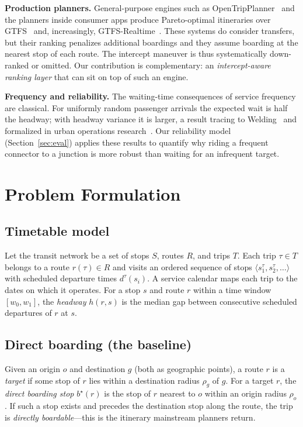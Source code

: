 \documentclass[conference]{IEEEtran}
\begin{document}
\textbf{Production planners.} General-purpose engines such as
OpenTripPlanner~\cite{otp} and the planners inside consumer apps produce
Pareto-optimal itineraries over GTFS~\cite{gtfs} and, increasingly,
GTFS-Realtime~\cite{gtfsrt}. These systems do consider transfers, but their
ranking penalizes additional boardings and they assume boarding at the nearest
stop of each route. The intercept maneuver is thus systematically
down-ranked or omitted. Our contribution is complementary: an
\emph{intercept-aware ranking layer} that can sit on top of such an engine.

\textbf{Frequency and reliability.} The waiting-time consequences of service
frequency are classical. For uniformly random passenger arrivals the expected
wait is half the headway; with headway variance it is larger, a result tracing to
Welding~\cite{welding1957} and formalized in urban operations
research~\cite{osuna1972,larson1981}. Our reliability model
(Section~\ref{sec:eval}) applies these results to quantify why riding a frequent
connector to a junction is more robust than waiting for an infrequent target.

\section{Problem Formulation}
\label{sec:problem}
\subsection{Timetable model}
Let the transit network be a set of stops $S$, routes $R$, and trips $T$. Each
trip $\tau \in T$ belongs to a route $r(\tau)\in R$ and visits an ordered
sequence of stops $\langle s_1^{\tau}, s_2^{\tau}, \ldots \rangle$ with scheduled
departure times $d^{\tau}(s_i)$. A service calendar maps each trip to the dates
on which it operates. For a stop $s$ and route $r$ within a time window
$[w_0, w_1]$, the \emph{headway} $h(r,s)$ is the median gap between consecutive
scheduled departures of $r$ at $s$.

\subsection{Direct boarding (the baseline)}
Given an origin $o$ and destination $g$ (both as geographic points), a route
$r$ is a \emph{target} if some stop of $r$ lies within a destination radius
$\rho_g$ of $g$. For a target $r$, the \emph{direct boarding stop}
$b^\star(r)$ is the stop of $r$ nearest to $o$ within an origin radius $\rho_o$.
If such a stop exists and precedes the destination stop along the route, the trip
is \emph{directly boardable}---this is the itinerary mainstream planners return.
\end{document}
